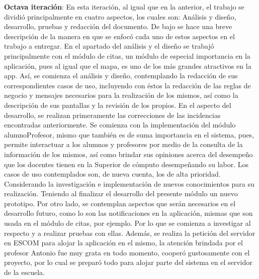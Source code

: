 \noindent
\newline
\textbf{Octava iteración}: En esta iteración, al igual que en la anterior, el trabajo se dividió principalmente en cuatro aspectos, los cuales son: Análisis y diseño, desarrollo, pruebas y redacción del documento. De bajo se hace una breve descripción de la manera en que se enfocó cada uno de estos aspectos en el trabajo a entregar.
\newline
\newline
En el apartado del análisis y el diseño se trabajó principalmente con el módulo de citas, un módulo de especial importancia en la aplicación, pues al igual que el mapa, es uno de los más grandes atractivos en la app. Así, se comienza el análisis y diseño, contemplando la redacción de sus correspondientes casos de uso, incluyendo con éstos la redacción de las reglas de negocio y mensajes necesarios para la realización de los mismos, así como la descripción de sus pantallas y la revisión de los propios. 
\newline
\newline
En el aspecto del desarrollo, se realizan primeramente las correcciones de las incidencias encontradas anteriormente. Se comienza con la implementación del módulo alumnoProfesor, mismo que también es de suma importancia en el sistema, pues, permite interactuar a los alumnos y profesores por medio de la consulta de la información de los mismos, así como brindar sus opiniones acerca del desempeño que los docentes tienen en la Superior de cómputo desempeñando su labor. Los casos de uso contemplados son, de nueva cuenta, los de alta prioridad. Considerando la investigación e implementación de nuevos conocimientos para su realización. Teniendo al finalizar el desarrollo del presente módulo un nuevo prototipo. 
\newline
Por otro lado, se contemplan aspectos que serán necesarios en el desarrollo futuro, como lo son las notificaciones en la aplicación, mismas que son usada en el módulo de citas, por ejemplo. Por lo que se comienza a investigar al respecto y a realizar pruebas con ellas. 
\newline
Además, se realiza la petición del servidor en ESCOM para alojar la aplicación en el mismo, la atención brindada por el profesor Antonio fue muy grata en todo momento, cooperó gustosamente con el proyecto, por lo cual se preparó todo para alojar parte del sistema en el servidor de la escuela.
\newline
\newline

